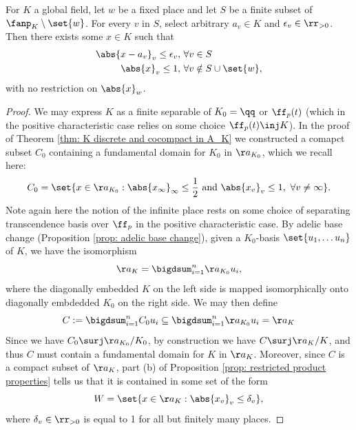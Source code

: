 \documentclass[11pt, x11names, openany]{book}
\begin{document}
\begin{theorem}
    \label{thm: Strong approximation of A_K}
    For $K$ a global field, let $w$ be a fixed place and let $S$ be a finite subset of $\fanp_K \setminus \set{w}$. For every $v$ in $S$, select arbitrary $a_v \in K$ and $\epsilon_v \in \rr_{> 0}$. Then there exists some $x \in K$ such that
    \begin{align*}
        \abs{x - a_v}_v \leq \epsilon_v, \ &\forall v \in S\\
        \abs{x}_v \leq 1, \ & \forall v \notin S \cup \set{w},
    \end{align*}
    with no restriction on $\abs{x}_w$.
\end{theorem}
\begin{proof}
We may express $K$ as a finite separable of $K_0 = \qq$ or $\ff_p(t)$ (which in the positive characteristic case relies on some choice $\ff_p(t) \inj K$). In the proof of Theorem \ref{thm: K discrete and cocompact in A_K} we constructed a comapct subset $C_0$ containing a fundamental domain for $K_0$ in $\aa_{K_0}$, which we recall here:
\begin{equation*}
    C_0 = \set{x \in \aa_{K_0} : \abs{x_\infty}_\infty \leq \frac{1}{2} \text{ and } \abs{x_v}_v \leq 1, \ \forall v \neq \infty}.
\end{equation*}
Note again here the notion of the infinite place rests on some choice of separating transcendence basis over $\ff_p$ in the positive characteristic case. By adelic base change (Proposition \ref{prop: adelic base change}), given a $K_0$-basis $\set{u_1, \ldots u_n}$ of $K$, we have the isomorphism
\begin{equation*}
    \aa_K = \bigdsum_{i = 1}^n \aa_{K_0}u_i,
\end{equation*}
where the diagonally embedded $K$ on the left side is mapped isomorphically onto diagonally embdedded $K_0$ on the right side. We may then define
\begin{equation*}
    C := \bigdsum^{n}_{i=1} C_0 u_i \subseteq \bigdsum_{i = 1}^n \aa_{K_0}u_i = \aa_K
\end{equation*}
Since we have $C_0 \surj \aa_{K_0}/K_0$, by construction we have $C \surj \aa_K/K$, and thus $C$ must contain a fundamental domain for $K$ in $\aa_K$. Moreover, since $C$ is a compact subset of $\aa_K$, part (b) of Proposition \ref{prop: restricted product properties} tells us that it is contained in some set of the form
\begin{equation*}
    W = \set{x \in \aa_K : \abs{x_v}_v \leq \delta_v},
\end{equation*}
where $\delta_v \in \rr_{> 0}$ is equal to 1 for all but finitely many places.


\end{proof}
\end{document}

